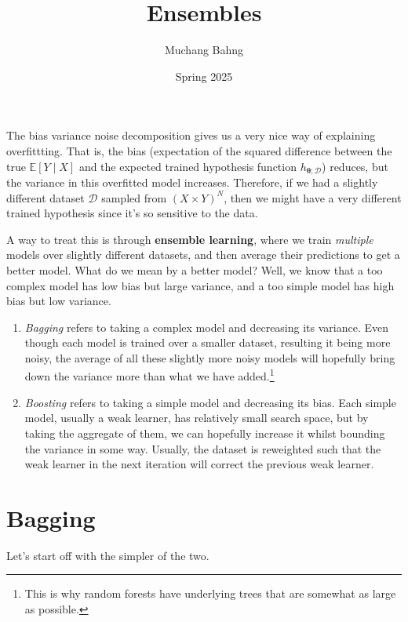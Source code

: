 \documentclass{article}
\begin{document}
\title{Ensembles}
\author{Muchang Bahng}
\date{Spring 2025}

\maketitle
\tableofcontents
\pagebreak

  The bias variance noise decomposition gives us a very nice way of explaining overfittting. That is, the bias (expectation of the squared difference between the true $\mathbb{E}[Y \mid X]$ and the expected trained hypothesis function $h_{\boldsymbol{\theta}; \mathcal{D}}$) reduces, but the variance in this overfitted model increases. Therefore, if we had a slightly different dataset $\mathcal{D}$ sampled from $(X \times Y)^N$, then we might have a very different trained hypothesis since it's so sensitive to the data. 

  A way to treat this is through \textbf{ensemble learning}, where we train \textit{multiple} models over slightly different datasets, and then average their predictions to get a better model. What do we mean by a better model? Well, we know that a too complex model has low bias but large variance, and a too simple model has high bias but low variance. 

  \begin{enumerate}
    \item \textit{Bagging} refers to taking a complex model and decreasing its variance. Even though each model is trained over a smaller dataset, resulting it being more noisy, the average of all these slightly more noisy models will hopefully bring down the variance more than what we have added.\footnote{This is why random forests have underlying trees that are somewhat as large as possible.} 
    \item \textit{Boosting} refers to taking a simple model and decreasing its bias. Each simple model, usually a weak learner, has relatively small search space, but by taking the aggregate of them, we can hopefully increase it whilst bounding the variance in some way. Usually, the dataset is reweighted such that the weak learner in the next iteration will correct the previous weak learner. 
  \end{enumerate}

\section{Bagging}

  Let's start off with the simpler of the two. 
\end{document}
